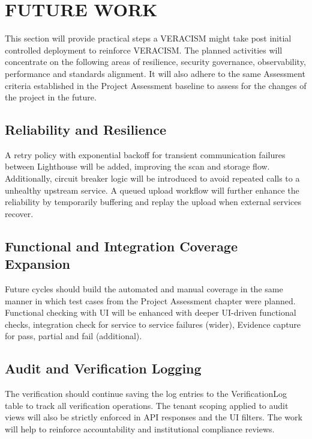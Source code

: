 \section{FUTURE WORK}

This section will provide practical steps a VERACISM might take post initial controlled deployment to reinforce VERACISM. The planned activities will concentrate on the following areas of resilience, security governance, observability, performance and standards alignment. It will also adhere to the same Assessment criteria established in the Project Assessment baseline to assess for the changes of the project in the future.

\subsection{Reliability and Resilience}

A retry policy with exponential backoff for transient communication failures between Lighthouse will be added, improving the scan and storage flow. Additionally, circuit breaker logic will be introduced to avoid repeated calls to a unhealthy upstream service. A queued upload workflow will further enhance the reliability by temporarily buffering and replay the upload when external services recover.

\subsection{Functional and Integration Coverage Expansion}

Future cycles should build the automated and manual coverage in the same manner in which test cases from the Project Assessment chapter were planned. Functional checking with UI will be enhanced with deeper UI-driven functional checks, integration check for service to service failures (wider), Evidence capture for pass, partial and fail (additional).

\subsection{Audit and Verification Logging}

The verification should continue saving the log entries to the VerificationLog table to track all verification operations. The tenant scoping applied to audit views will also be strictly enforced in API responses and the UI filters. The work will help to reinforce accountability and institutional compliance reviews.

